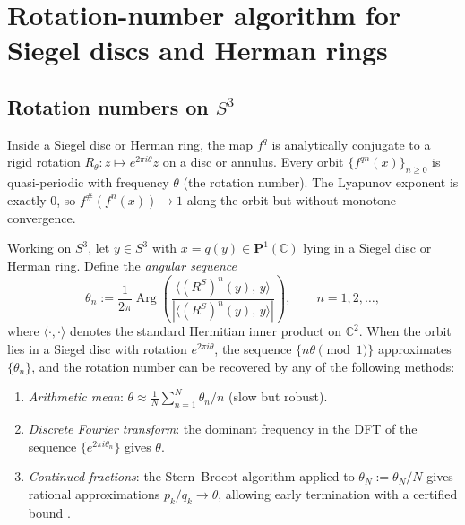 \documentclass[12pt]{article}
\theoremstyle{definition}
\newcommand{\C}{\mathbb{C}}
\newcommand{\Pone}{\mathbf{P}^1(\C)}
\newcommand{\fsh}{f^{\#}}            %
\newcommand{\RS}{R^S}
\DeclareMathOperator{\Arg}{Arg}
\begin{document}
\section{Rotation-number algorithm for Siegel discs and Herman rings}
\label{sec:rotation}

\subsection{Rotation numbers on \texorpdfstring{$S^3$}{S3}}

Inside a Siegel disc or Herman ring, the map $f^q$ is analytically
conjugate to a rigid rotation $R_\theta: z \mapsto e^{2\pi i\theta} z$ on
a disc or annulus.  Every orbit $\{f^{qn}(x)\}_{n\ge 0}$ is quasi-periodic
with frequency $\theta$ (the rotation number).  The Lyapunov exponent is
exactly $0$, so $\fsh(f^n(x)) \to 1$ along the orbit but without
monotone convergence.

Working on $S^3$, let $y \in S^3$ with $x = q(y) \in \Pone$ lying in a
Siegel disc or Herman ring.  Define the \emph{angular sequence}
\begin{equation}\label{eq:angle_seq}
  \theta_n := \frac{1}{2\pi}\Arg\!\left(\frac{\langle (\RS)^n(y),\, y\rangle}
  {|\langle (\RS)^n(y),\, y\rangle|}\right), \qquad n = 1, 2, \ldots,
\end{equation}
where $\langle\cdot,\cdot\rangle$ denotes the standard Hermitian inner
product on $\C^2$.  When the orbit lies in a Siegel disc with rotation
$e^{2\pi i\theta}$, the sequence $\{n\theta \pmod 1\}$ approximates
$\{\theta_n\}$, and the rotation number can be recovered by any of the
following methods:
\begin{enumerate}[label=(\alph*)]
  \item \emph{Arithmetic mean}: $\theta \approx \frac{1}{N}\sum_{n=1}^N
        \theta_n / n$ (slow but robust).
  \item \emph{Discrete Fourier transform}: the dominant frequency in the
        DFT of the sequence $\{e^{2\pi i \theta_n}\}$ gives $\theta$.
  \item \emph{Continued fractions}: the Stern--Brocot algorithm applied to
        $\theta_N := \theta_N / N$ gives rational approximations
        $p_k/q_k \to \theta$, allowing early termination with a certified
        bound \cite{Yoccoz1988}.
\end{enumerate}
\end{document}
